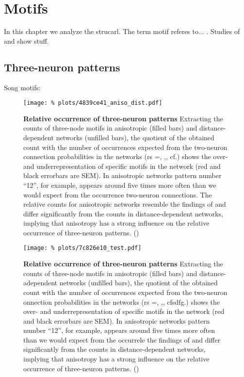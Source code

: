 

\section{Motifs}

In this chapter we analyze the strucarl. The term motif referes
to... . Studies of \textcite{Song2005} and \textcite{Perin2011} show
stuff.

\subsection*{Three-neuron patterns}

Song motifs:


\begin{figure}[H]
  \centering
  \texttt{[image: \%
    plots/4839ce41\_aniso\_dist.pdf]} 
  \captionsetup{skip=8pt}
  \caption{\textbf{Relative occurrence of three-neuron patterns}
    Extracting the counts of three-node motifs in anisotropic (filled
    bars) and distance-dependent networks (unfilled bars), the
    quotient of the obtained count with the number of occurrences
    expected from the two-neuron connection probabilities in the
    networks (rs =, ,, cf.) shows the over- and underrepresentation of
    specific motifs in the network (red and black errorbars are
    SEM). In anisotropic networks pattern number \enquote{12}, for
    example, appears around five times more often than we would expect
    from the occurrence two-neuron connections. The relative counts
    for anisotropic networks resemble the findings of
    \textcite{Song2005} and differ significantly from the counts in
    distance-dependent networks, implying that anisotropy has a strong
    influence on the relative occurrence of three-neuron
    patterns. () }
  \label{fig:distance_theory_compare}
\end{figure}




\begin{figure}[H]
  \centering
  \texttt{[image: \%
    plots/7c826e10\_test.pdf]} 
  \captionsetup{skip=8pt}
  \caption{\textbf{Relative occurrence of three-neuron patterns}
    Extracting the counts of three-node motifs in anisotropic (filled
    bars) and distance-adependent networks (unfilled bars), the
    quotient of the obtained count with the number of occurrences
    expected from the two-neuron onnection probabilities in the
    networks (rs =, ,, cfsdfg.) shows the over- and underrepresentation of
    specific motifs in the network (red and black errorbars are
    SEM). In anisotropic networks pattern number \enquote{12}, for
    example, appears around five times more often than we would expect
    from the occurrele the findings of
    \textcite{Song2005} and differ significantly from the counts in
    distance-dependent networks, implying that anisotropy has a strong
    influence on the relative occurrence of three-neuron
    patterns. () }
  \label{fig:distance_theory_compare}
\end{figure}



